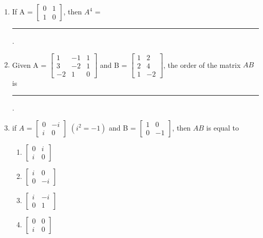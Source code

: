 \documentclass{article}
\begin{document}
\begin{enumerate}
    \item If A = $\begin{bmatrix}
        0 & 1\\
        1 & 0
    \end{bmatrix}$, then $A^4$ = \rule{2cm}{0.15mm}.

    \item Given A = $\begin{bmatrix}
        1 & -1 & 1\\
        3 & -2 & 1\\
        -2 & 1 & 0
    \end{bmatrix}$ and
    B = $\begin{bmatrix}
        1 & 2\\
        2 & 4\\
        1 & -2
    \end{bmatrix}$, the order of the matrix $AB$ is \rule{2cm}{0.15mm}.
    
    \item if $A$ = $\begin{bmatrix}
        0 & -i\\
        i & 0
    \end{bmatrix}$ $(i^2 = -1)$ and  B = $\begin{bmatrix}
        1 & 0\\
        0 & -1
    \end{bmatrix}$, then $AB$ is equal to
    \begin{enumerate}
        \item $\begin{bmatrix}
            0 & i\\
            i & 0
        \end{bmatrix}$
        \item $\begin{bmatrix}
            i & 0\\
            0 & -i
        \end{bmatrix}$
        \item $\begin{bmatrix}
            i & -i\\
            0 & 1
        \end{bmatrix}$
        \item $\begin{bmatrix}
            0 & 0\\
            i & 0
        \end{bmatrix}$
    \end{enumerate}
   

\end{enumerate}
\end{document}
